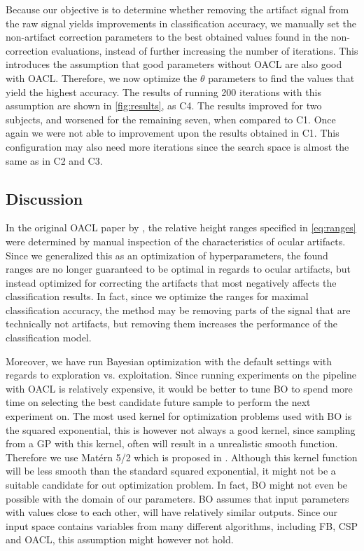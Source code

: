 Because our objective is to determine whether removing the artifact signal from the raw signal yields improvements in classification accuracy, we manually set the non-artifact correction parameters to the best obtained values found in the non-correction evaluations, instead of further increasing the number of iterations. This introduces the assumption that good parameters without OACL are also good with OACL. Therefore, we now optimize the $\theta$ parameters to find the values that yield the highest accuracy. The results of running 200 iterations with this assumption are shown in \cref{fig:results}, as C4. The results improved for two subjects, and worsened for the remaining seven, when compared to C1. Once again we were not able to improvement upon the results obtained in C1. This configuration may also need more iterations since the search space is almost the same as in C2 and C3.

\subsection{Discussion}\label{sec:discussion}
In the original OACL paper by \citep{li2015ocular}, the relative height ranges specified in \cref{eq:ranges} were determined by manual inspection of the characteristics of ocular artifacts. Since we generalized this as an optimization of hyperparameters, the found ranges are no longer guaranteed to be optimal in regards to ocular artifacts, but instead optimized for correcting the artifacts that most negatively affects the classification results. In fact, since we optimize the ranges for maximal classification accuracy, the method may be removing parts of the signal that are technically not artifacts, but removing them increases the performance of the classification model.

Moreover, we have run Bayesian optimization with the default settings with regards to exploration vs. exploitation. Since running experiments on the pipeline with OACL is relatively expensive, it would be better to tune BO to spend more time on selecting the best candidate future sample to perform the next experiment on. The most used kernel for optimization problems used with BO is the squared exponential, this is however not always a good kernel, since sampling from a GP with this kernel, often will result in a unrealistic smooth function. Therefore we use Matérn 5/2 which is proposed in \citep{snoek2012practical}. Although this kernel function will be less smooth than the standard squared exponential, it might not be a suitable candidate for out optimization problem. In fact, BO might not even be possible with the domain of our parameters. BO assumes that input parameters with values close to each other, will have relatively similar outputs. Since our input space contains variables from many different algorithms, including FB, CSP and OACL, this assumption might however not hold. 

